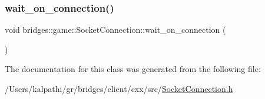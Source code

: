 \subsubsection{\texorpdfstring{wait\+\_\+on\+\_\+connection()}{wait\_on\_connection()}}
{\footnotesize\ttfamily void bridges\+::game\+::\+Socket\+Connection\+::wait\+\_\+on\+\_\+connection (\begin{DoxyParamCaption}{ }\end{DoxyParamCaption})\hspace{0.3cm}{\ttfamily [inline]}}



The documentation for this class was generated from the following file\+:\begin{DoxyCompactItemize}
\item 
/\+Users/kalpathi/gr/bridges/client/cxx/src/\mbox{\hyperlink{_socket_connection_8h}{Socket\+Connection.\+h}}\end{DoxyCompactItemize}
